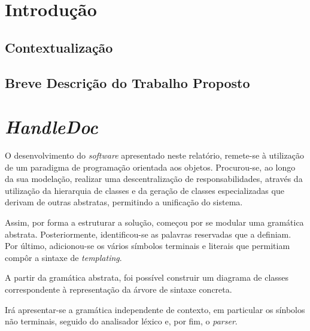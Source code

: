 \documentclass[11pt]{report}
\begin{document}
\maketitle    

\tableofcontents


%
%
%
\chapter{Introdução}
\section{Contextualização} 



\section{Breve Descrição do Trabalho Proposto}



\chapter{\textit{HandleDoc}}
O desenvolvimento do \textit{software} apresentado neste relatório,
remete-se à utilização de um paradigma de programação orientada aos objetos.
Procurou-se, ao longo da sua modelação, realizar uma descentralização de responsabilidades,
através da utilização da hierarquia de classes e da geração de classes especializadas que
derivam de outras abstratas, permitindo a unificação do sistema.

Assim, por forma a estruturar a solução, começou por se modular uma gramática abstrata.
Posteriormente, identificou-se as palavras reservadas que a definiam.
Por último, adicionou-se os vários símbolos terminais e literais que permitiam
compôr a sintaxe de \textit{templating}.

A partir da gramática abstrata, foi possível construir um diagrama de classes
correspondente à representação da árvore de sintaxe concreta.

Irá apresentar-se a gramática independente de contexto, em particular os sínbolos não terminais,
seguido do analisador léxico e, por fim, o \textit{parser}.
\end{document}
